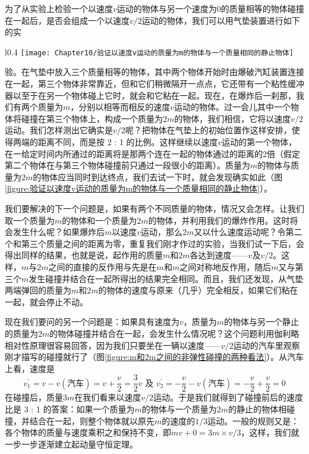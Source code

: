 为了从实验上检验一个以速度$v$运动的物体与另一个速度为0的质量相等的物体碰撞在一起后，是否会组成一个以速度$v/2$运动的物体，我们可以用气垫装置进行如下的实
\begin{wrapfigure}{l}{0.4\textwidth}
    \centering
    \texttt{[image: Chapter10/验证以速度v运动的质量为m的物体与一个质量相同的静止物体]}
    \caption{验证以速度$v$运动的质量为$m$的物体与一个质量相同的静止物体碰撞后结合在一起以质量$2m$、速度$m/2$运动的实验}
    \label{figure:验证以速度v运动的质量为m的物体与一个质量相同的静止物体}
\end{wrapfigure}
验。在气垫中放入三个质量相等的物体，其中两个物体开始时由爆破汽缸装置连接在一起，第三个物体非常靠近，但和它们稍微隔开一点点，它还带有一个粘性缓冲器以至于在另一个物体碰上它时，就会和它粘在一起。现在，在爆炸后一刹那，我们有两个质量为$m$，分别以相等而相反的速度$v$运动的物体。过一会儿其中一个物体将碰撞在第三个物体上，构成一个质量为$2m$的物体，我们相信，它将以速度$v/2$运动。我们怎样测出它确实是$v/2$呢？把物体在气垫上的初始位置作这样安排，使得两端的距离不同，而是按 2 : 1 的比例。这样继续以速度$v$运动的第一个物体，在一给定时间内所通过的距离将是那两个连在一起的物体通过的距离的2倍（假定第二个物体在与第三个物体碰撞前只通过一段很小的距离）。质量为$m$的物体与质量为$2m$的物体应当同时到达终点，我们去试一下时，就会发现确实如此（图\ref{figure:验证以速度v运动的质量为m的物体与一个质量相同的静止物体}）。

我们要解决的下一个问题是，如果有两个不同质量的物体，情况又会怎样。让我们取一个质量为$m$的物体和一个质量为$2m$的物体，并利用我们的爆炸作用。这时将会发生什么呢？如果爆炸后$m$以速度$v$运动，那么$2m$又以什么速度运动呢？令第二个和第三个质量之间的距离为零，重复我们刚才作过的实验，当我们试一下后，会得出同样的结果，也就是说，起作用的质量$m$和$2m$各达到速度——$v$及$v/2$。这样，$m$与$2m$之间的直接的反作用与先是在$m$和$m$之间对称地反作用，随后$m$又与第三个$m$发生碰撞并结合在一起所得出的结果完全相同。而且，我们还发现，从气垫两端弹回的质量为$m$和$2m$的物体的速度与原来（几乎）完全相反，如果它们粘在一起，就会停止不动。

现在我们要问的另一个问题是：如果具有速度为$v$，质量为$m$的物体与另一个静止的质量为$2m$的物体碰撞并结合在一起，会发生什么情况呢？这个问题利用伽利略相对性原理很容易回答，因为我们只要坐在一辆以速度——$v/2$运动的汽车里观察刚才描写的碰撞就行了（图\ref{figure:m和2m之间的非弹性碰撞的两种看法}）。从汽车上看，速度是
\begin{equation*}
v_1^{'}=v-v(\text{汽车})=v+\frac{v}{2}=\frac{3}{2}v \text{ 及 } v_2^{'}=-\frac{v}{2}-v(\text{汽车})=-\frac{v}{2}+\frac{v}{2}=0
\end{equation*}
在碰撞后，质量$3m$在我们看来以速度$v/2$运动。于是我们就得到了碰撞前后的速度比是 3 : 1 的答案：如果一个质量为$m$的物体与一个质量为$2m$的静止的物体相碰撞，并结合在一起，则整个物体就以原先$m$的速度的$1/3$运动。一般的规则又是：各个物体的质量与速度乘积之和保持不变，即$mv+0=3m \times v/3$，这样，我们就一步一步逐渐建立起动量守恒定理。

